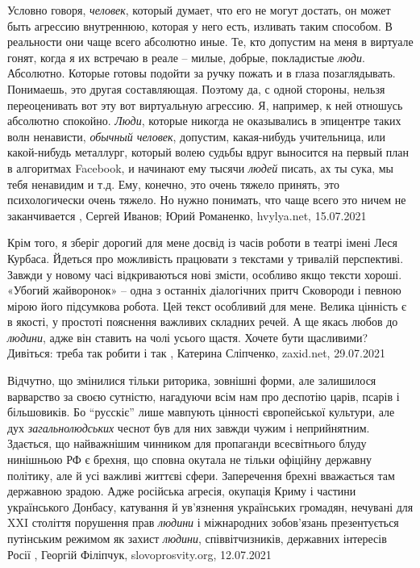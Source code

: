 Условно говоря, \emph{человек}, который думает, что его не могут достать, он
может быть агрессию внутреннюю, которая у него есть, изливать таким способом. В
реальности они чаще всего абсолютно иные. Те, кто допустим на меня в виртуале
гонят, когда я их встречаю в реале – милые, добрые, покладистые \emph{люди}.
Абсолютно.  Которые готовы подойти за ручку пожать и в глаза позаглядывать.
Понимаешь, это другая составляющая. Поэтому да, с одной стороны, нельзя
переоценивать вот эту вот виртуальную агрессию. Я, например, к ней отношусь
абсолютно спокойно.  \emph{Люди}, которые никогда не оказывались в эпицентре
таких волн ненависти, \emph{обычный человек}, допустим, какая-нибудь учительница, или
какой-нибудь металлург, который волею судьбы вдруг выносится на первый план в
алгоритмах Facebook, и начинают ему тысячи \emph{людей} писать, ах ты сука, мы тебя
ненавидим и т.д. Ему, конечно, это очень тяжело принять, это психологически
очень тяжело. Но нужно понимать, что чаще всего это ничем не заканчивается
, 
Сергей Иванов; Юрий Романенко, hvylya.net, 15.07.2021

Крім того, я зберіг дорогий для мене досвід із часів роботи в театрі імені Леся
Курбаса. Йдеться про можливість працювати з текстами у тривалій перспективі.
Завжди у новому часі відкриваються нові змісти, особливо якщо тексти хороші.
«Убогий жайворонок» – одна з останніх діалогічних притч Сковороди і певною
мірою його підсумкова робота. Цей текст особливий для мене. Велика цінність є в
якості, у простоті пояснення важливих складних речей. А ще якась любов до
\emph{людини}, адже він ставить на чолі усього щастя. Хочете бути щасливими? Дивіться:
треба так робити і так
, 
Катерина Сліпченко, zaxid.net, 29.07.2021

Відчутно, що змінилися тільки риторика, зовнішні форми, але залишилося
варварство за своєю сутністю, нагадуючи всім нам про деспотію царів, псарів і
більшовиків. Бо \enquote{русскіє} лише мавпують цінності європейської культури, але дух
\emph{загальнолюдських} чеснот був для них завжди чужим і неприйнятним.  Здається, що
найважнішим чинником для пропаганди всесвітнього блуду нинішньою РФ є брехня,
що сповна окутала не тільки офіційну державну політику, але й усі важливі
життєві сфери. Заперечення брехні вважається там державною зрадою. Адже
російська агресія, окупація Криму і частини українського Донбасу, катування й
ув’язнення українських громадян, нечувані для XXI століття порушення прав
\emph{людини} і міжнародних зобов’язань презентується путінським режимом як захист
\emph{людини}, співвітчизників, державних інтересів Росії
, Георгій Філіпчук, slovoprosvity.org, 12.07.2021

